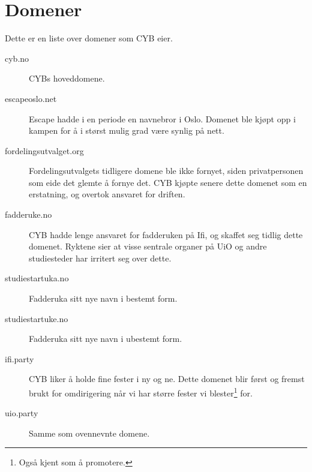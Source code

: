 \chapter*{Domener}

Dette er en liste over domener som CYB eier.

\begin{description}
    \item[cyb.no] CYBs hoveddomene. 
        
    \item[escapeoslo.net] Escape hadde i en periode en navnebror i Oslo. Domenet ble kjøpt opp i kampen for å i størst mulig grad være synlig på nett.
        
    \item[fordelingsutvalget.org] Fordelingsutvalgets tidligere domene ble ikke fornyet, siden privatpersonen som eide det glemte å fornye det. CYB kjøpte senere dette domenet som en erstatning, og overtok ansvaret for driften.

    \item[fadderuke.no] CYB hadde lenge ansvaret for fadderuken på Ifi, og skaffet seg tidlig dette domenet. Ryktene sier at visse sentrale organer på UiO og andre studiesteder har irritert seg over dette.
        
    \item[studiestartuka.no] Fadderuka sitt nye navn i bestemt form.
        
    \item[studiestartuke.no] Fadderuka sitt nye navn i ubestemt form.
        
    \item[ifi.party] CYB liker å holde fine fester i ny og ne. Dette domenet blir først og fremst brukt for omdirigering når vi har større fester vi blester\footnote{Også kjent som å promotere.} for.
        
    \item[uio.party] Samme som ovennevnte domene.
\end{description}
